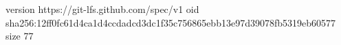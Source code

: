 version https://git-lfs.github.com/spec/v1
oid sha256:12ff0fc61d4ca1d4ccdadcd3dc1f35c756865ebb13e97d39078fb5319eb60577
size 77
